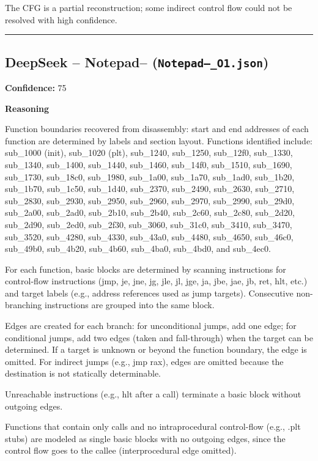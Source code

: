 The CFG is a partial reconstruction; some indirect control flow could not be resolved with high confidence.

\bigskip
\hrule
\bigskip

\subsection{DeepSeek -- Notepad-- (\texttt{Notepad--\_O1.json})}

\textbf{Confidence:} 75

\textbf{Reasoning}

Function boundaries recovered from disassembly: start and end addresses of each function are determined by labels and section layout. Functions identified include: sub\_1000 (init), sub\_1020 (plt), sub\_1240, sub\_1250, sub\_12f0, sub\_1330, sub\_1340, sub\_1400, sub\_1440, sub\_1460, sub\_14f0, sub\_1510, sub\_1690, sub\_1730, sub\_18c0, sub\_1980, sub\_1a00, sub\_1a70, sub\_1ad0, sub\_1b20, sub\_1b70, sub\_1c50, sub\_1d40, sub\_2370, sub\_2490, sub\_2630, sub\_2710, sub\_2830, sub\_2930, sub\_2950, sub\_2960, sub\_2970, sub\_2990, sub\_29d0, sub\_2a00, sub\_2ad0, sub\_2b10, sub\_2b40, sub\_2c60, sub\_2c80, sub\_2d20, sub\_2d90, sub\_2ed0, sub\_2f30, sub\_3060, sub\_31c0, sub\_3410, sub\_3470, sub\_3520, sub\_4280, sub\_4330, sub\_43a0, sub\_4480, sub\_4650, sub\_46c0, sub\_49b0, sub\_4b20, sub\_4b60, sub\_4ba0, sub\_4bd0, and sub\_4ec0.

For each function, basic blocks are determined by scanning instructions for control-flow instructions (jmp, je, jne, jg, jle, jl, jge, ja, jbe, jae, jb, ret, hlt, etc.) and target labels (e.g., address references used as jump targets). Consecutive non-branching instructions are grouped into the same block.

Edges are created for each branch: for unconditional jumps, add one edge; for conditional jumps, add two edges (taken and fall-through) when the target can be determined. If a target is unknown or beyond the function boundary, the edge is omitted. For indirect jumps (e.g., jmp rax), edges are omitted because the destination is not statically determinable.

Unreachable instructions (e.g., hlt after a call) terminate a basic block without outgoing edges.

Functions that contain only calls and no intraprocedural control-flow (e.g., .plt stubs) are modeled as single basic blocks with no outgoing edges, since the control flow goes to the callee (interprocedural edge omitted).

